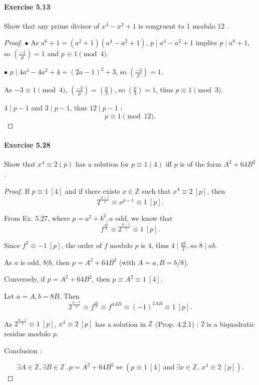 \documentclass{article}
\begin{document}
\paragraph{Exercise 5.13} Show that any prime divisor of $x^{4}-x^{2}+1$ is congruent to 1 modulo 12 .
\begin{proof}    
\newcommand{\legendre}[2]{\genfrac{(}{)}{}{}{#1}{#2}}
$\bullet$ As $a^6 +1 = (a^2+1)(a^4-a^2+1)$, $p\mid a^4 - a^2+1$ implies $p \mid a^6 + 1$, so $\legendre{-1}{p} = 1$ and $p\equiv 1 \pmod 4$.

$\bullet$ $p \mid 4a^4 - 4 a^2 +4 = (2a-1)^2 + 3$, so $\legendre{-3}{p} = 1$.

As $-3 \equiv 1 \pmod 4$, $\legendre{-3}{p} = \legendre{p}{3}$, so $\legendre{p}{3} = 1$, thus $p \equiv 1 \pmod 3$.

$4 \mid p-1$ and $3 \mid p-1$, thus $12 \mid p-1$ : $$p \equiv 1 \pmod {12}.$$
\end{proof}



\paragraph{Exercise 5.28} Show that $x^{4} \equiv 2(p)$ has a solution for $p \equiv 1(4)$ iff $p$ is of the form $A^{2}+64 B^{2}$.
\begin{proof}    
If  $p\equiv 1\ [4]$ and if there exists $x \in \mathbb{Z}$ such that $x^4 \equiv 2\ [p]$, then
$$2^{\frac{p-1}{4} }\equiv  x^{p-1} \equiv 1 \ [p].$$ 

From Ex. 5.27, where $p = a^2 +b^2, a$ odd,  we know that $$f^{\frac{ab}{2}} \equiv 2^{\frac{p-1}{4} } \equiv 1 \ [p].$$

Since $f^2 \equiv -1\ [p]$, the order of $f$ modulo $p$ is 4, thus $4 \mid \frac{ab}{2}$, so $8\mid ab$.

As $a$ is odd, $8 | b$, then $p = A^2 + 64 B^2$ (with $A = a, B = b/8$).

\bigskip

Conversely, if $p=A^2+64 B^2$, then $p\equiv A^2 \equiv 1 \ [4]$.

Let $a=A,b=8B$. Then $$2^{\frac{p-1}{4} } \equiv f^{\frac{ab}{2}} \equiv f^{4AB} \equiv (-1)^{2AB} \equiv 1 \ [p].$$

As $2^{\frac{p-1}{4} } \equiv 1 \ [p]$, $x^4 \equiv 2 \ [p]$ has a solution in $\mathbb{Z}$ (Prop. 4.2.1) : $2$ is a biquadratic residue modulo $p$.

Conclusion : 

$$\exists A \in \mathbb{Z}, \exists B \in \mathbb{Z}\,, p = A^2+64 B^2 \iff( p\equiv 1 \ [4] \ \mathrm{and} \ \exists x \in \mathbb{Z}, \, x^4 \equiv 2 \ [p]).$$
\end{proof}
\end{document}
